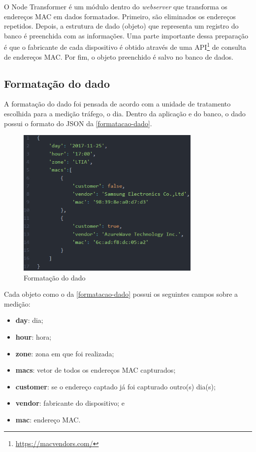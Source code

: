 O Node Transformer é um módulo dentro do \emph{webserver}
que transforma os endereços MAC em dados formatados.
Primeiro, são eliminados os endereços repetidos. Depois, a estrutura de dado (objeto)
que representa um registro do banco é preenchida com as informações. Uma parte importante dessa preparação
é que o fabricante de cada dispositivo é obtido através de uma API\footnote{\url{https://macvendors.com/}} de consulta de endereços MAC. Por fim,
o objeto preenchido é salvo no banco de dados.

\subsection{Formatação do dado}
A formatação do dado foi pensada de acordo com a unidade de tratamento escolhida para a medição tráfego, o dia.
Dentro da aplicação e do banco, o dado possui o formato do JSON da \autoref{formatacao-dado}.

\begin{figure}[!h]
  \caption{\label{formatacao-dado}Formatação do dado}
  \begin{center}
    \includegraphics[width=0.8\textwidth]{img/formato-dado.png}
  \end{center}
\end{figure}

Cada objeto como o da \autoref{formatacao-dado} possui os seguintes campos sobre a medição:
\begin{itemize}
    \item \textbf{day}: dia;
    \item \textbf{hour}: hora;
    \item \textbf{zone}: zona em que foi realizada;
    \item \textbf{macs}: vetor de todos os endereços MAC capturados;
    \item \textbf{customer}: se o endereço captado já foi capturado outro(s) dia(s);
    \item \textbf{vendor}: fabricante do dispositivo; e
    \item \textbf{mac}: endereço MAC.
\end{itemize}

